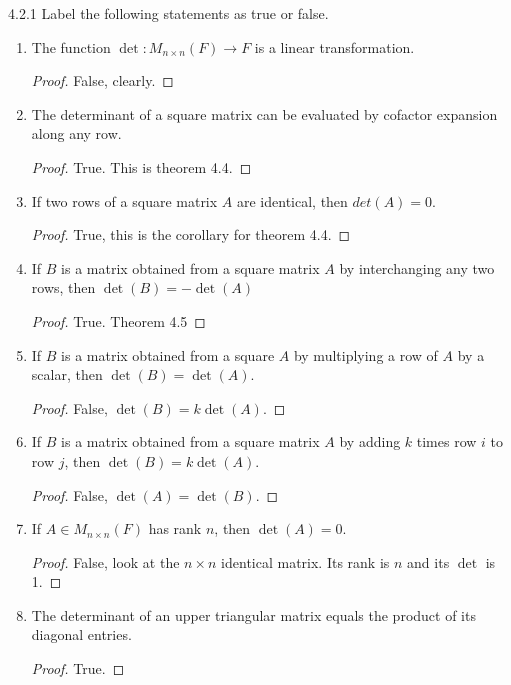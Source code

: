 \documentclass[12pt, a4paper]{article}
\theoremstyle{plain}
\begin{document}
\begin{exercise}{4.2.1}
Label the following statements as true or false.
	\begin{enumerate}[label=(\alph*)]
	\item The function $\det:M_{n\times n}(F)\rightarrow F$ is a linear transformation.
		\begin{proof}
		False, clearly.
		\end{proof}
	\item The determinant of a square matrix can be evaluated by cofactor expansion along any row.
		\begin{proof}
		True. This is theorem 4.4.
		\end{proof}
	\item If two rows of a square matrix $A$ are identical, then $det(A)=0$.
		\begin{proof}
		True, this is the corollary for theorem 4.4.
		\end{proof}
	\item If $B$ is a matrix obtained from a square matrix $A$  by interchanging any two rows, then $\det(B)=-\det(A)$
		\begin{proof}
		True. Theorem 4.5
		\end{proof}
	\item If $B$ is a matrix obtained from a square $A$ by multiplying a row of $A$ by a scalar, then $\det(B)=\det(A)$.
		\begin{proof}
		False, $\det(B)=k\det(A)$.
		\end{proof}
	\item If $B$ is a matrix obtained from a square matrix $A$ by adding $k$ times row $i$ to row $j$, then $\det(B)=k\det(A)$.
		\begin{proof}
		False, $\det(A)=\det(B)$.
		\end{proof}
	\item If $A\in M_{n\times n}(F)$ has rank $n$, then $\det(A)=0$.
		\begin{proof}
		False, look at the $n\times n$ identical matrix. Its rank is $n$ and its $\det$ is 1.
		\end{proof}
	\item The determinant of an upper triangular matrix equals the product of its diagonal entries.
		\begin{proof}
		True. 
		\end{proof}
	\end{enumerate}
\end{exercise}

\pagebreak
\end{document}

